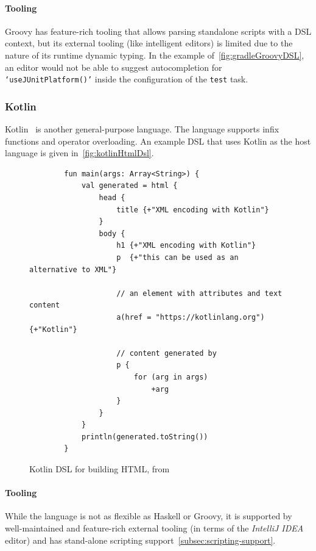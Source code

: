\paragraph{Tooling} Groovy has feature-rich tooling that allows parsing standalone scripts with a DSL context, but its external tooling (like intelligent editors) is limited due to the nature of its runtime dynamic typing.
In the example of~\autoref{fig:gradleGroovyDSL}, an editor would not be able to suggest autocompletion for \texttt{`useJUnitPlatform()'} inside the configuration of the \texttt{test} task.

\subsubsection{Kotlin}\label{subsubsec:kotlinLang}

Kotlin~\cite{kotlinLang} is another general-purpose language.
The language supports infix functions and operator overloading.
An example DSL that uses Kotlin as the host language is given in~\autoref{fig:kotlinHtmlDsl}.

\begin{figure}[h]
    \centering
    \begin{minipage}{0.9\textwidth}
        \begin{verbatim}
        fun main(args: Array<String>) {
            val generated = html {
                head {
                    title {+"XML encoding with Kotlin"}
                }
                body {
                    h1 {+"XML encoding with Kotlin"}
                    p  {+"this can be used as an alternative to XML"}

                    // an element with attributes and text content
                    a(href = "https://kotlinlang.org") {+"Kotlin"}

                    // content generated by
                    p {
                        for (arg in args)
                            +arg
                    }
                }
            }
            println(generated.toString())
        }
        \end{verbatim}
    \end{minipage}
    \caption{Kotlin DSL for building HTML, from~\cite{kotlinTypeSafeBuilders}}
    \label{fig:kotlinHtmlDsl}
\end{figure}

\paragraph{Tooling} While the language is not as flexible as Haskell or Groovy, it is supported by well-maintained and feature-rich external tooling (in terms of the \textit{IntelliJ IDEA} editor) and has stand-alone scripting support~\autoref{subsec:scripting-support}.

